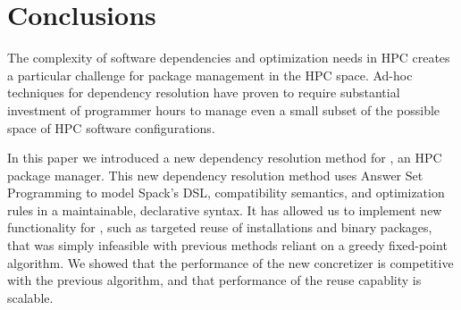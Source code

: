 \section{Conclusions}
\label{sec:conclusions}

The complexity of software dependencies and optimization needs in HPC creates a
particular challenge for package management in the HPC space. Ad-hoc techniques for
dependency resolution have proven to require substantial investment of programmer hours
to manage even a small subset of the possible space of HPC software configurations.

In this paper we introduced a new dependency resolution method for \spack{}, an HPC
package manager. This new dependency resolution method uses Answer Set Programming to
model Spack's DSL, compatibility semantics, and optimization rules in a maintainable,
declarative syntax. It has allowed us to implement new functionality for \spack{}, such
as targeted reuse of installations and binary packages, that was simply infeasible with
previous methods reliant on a greedy fixed-point algorithm.
%
We showed that the performance of the new concretizer is competitive with
the previous algorithm, and that performance of the reuse capablity is scalable.

